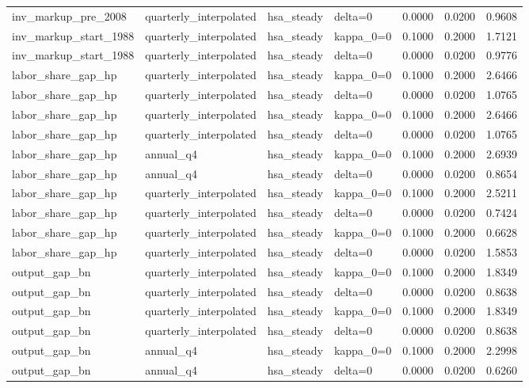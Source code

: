 \begin{tabular}{llllrrr}
inv\_markup\_pre\_2008 & quarterly\_interpolated & hsa\_steady & delta=0 & 0.0000 & 0.0200 & 0.9608 \\
inv\_markup\_start\_1988 & quarterly\_interpolated & hsa\_steady & kappa\_0=0 & 0.1000 & 0.2000 & 1.7121 \\
inv\_markup\_start\_1988 & quarterly\_interpolated & hsa\_steady & delta=0 & 0.0000 & 0.0200 & 0.9776 \\
labor\_share\_gap\_hp & quarterly\_interpolated & hsa\_steady & kappa\_0=0 & 0.1000 & 0.2000 & 2.6466 \\
labor\_share\_gap\_hp & quarterly\_interpolated & hsa\_steady & delta=0 & 0.0000 & 0.0200 & 1.0765 \\
labor\_share\_gap\_hp & quarterly\_interpolated & hsa\_steady & kappa\_0=0 & 0.1000 & 0.2000 & 2.6466 \\
labor\_share\_gap\_hp & quarterly\_interpolated & hsa\_steady & delta=0 & 0.0000 & 0.0200 & 1.0765 \\
labor\_share\_gap\_hp & annual\_q4 & hsa\_steady & kappa\_0=0 & 0.1000 & 0.2000 & 2.6939 \\
labor\_share\_gap\_hp & annual\_q4 & hsa\_steady & delta=0 & 0.0000 & 0.0200 & 0.8654 \\
labor\_share\_gap\_hp & quarterly\_interpolated & hsa\_steady & kappa\_0=0 & 0.1000 & 0.2000 & 2.5211 \\
labor\_share\_gap\_hp & quarterly\_interpolated & hsa\_steady & delta=0 & 0.0000 & 0.0200 & 0.7424 \\
labor\_share\_gap\_hp & quarterly\_interpolated & hsa\_steady & kappa\_0=0 & 0.1000 & 0.2000 & 0.6628 \\
labor\_share\_gap\_hp & quarterly\_interpolated & hsa\_steady & delta=0 & 0.0000 & 0.0200 & 1.5853 \\
output\_gap\_bn & quarterly\_interpolated & hsa\_steady & kappa\_0=0 & 0.1000 & 0.2000 & 1.8349 \\
output\_gap\_bn & quarterly\_interpolated & hsa\_steady & delta=0 & 0.0000 & 0.0200 & 0.8638 \\
output\_gap\_bn & quarterly\_interpolated & hsa\_steady & kappa\_0=0 & 0.1000 & 0.2000 & 1.8349 \\
output\_gap\_bn & quarterly\_interpolated & hsa\_steady & delta=0 & 0.0000 & 0.0200 & 0.8638 \\
output\_gap\_bn & annual\_q4 & hsa\_steady & kappa\_0=0 & 0.1000 & 0.2000 & 2.2998 \\
output\_gap\_bn & annual\_q4 & hsa\_steady & delta=0 & 0.0000 & 0.0200 & 0.6260 \\

\end{tabular}

